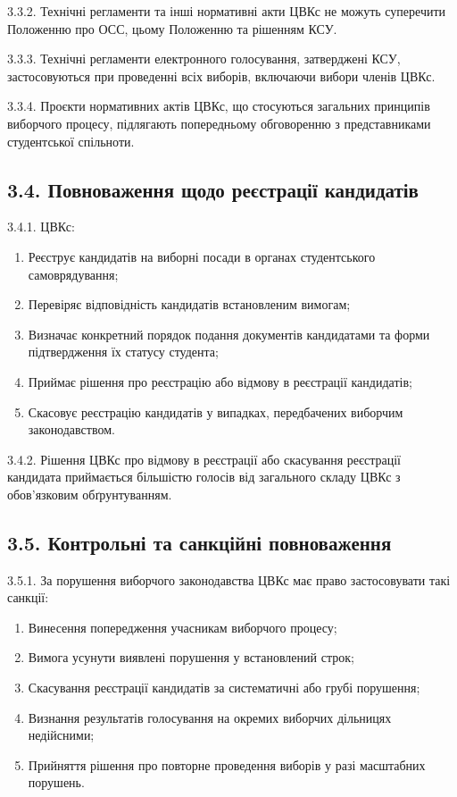     3.3.2. Технічні регламенти та інші нормативні акти ЦВКс не можуть суперечити Положенню про ОСС, цьому Положенню та рішенням КСУ.

    3.3.3. Технічні регламенти електронного голосування, затверджені КСУ, застосовуються при проведенні всіх виборів, включаючи вибори членів ЦВКс.

    3.3.4. Проєкти нормативних актів ЦВКс, що стосуються загальних принципів виборчого процесу, підлягають попередньому обговоренню з представниками студентської спільноти.

\subsection*{3.4. Повноваження щодо реєстрації кандидатів}
    3.4.1. ЦВКс:

        \begin{enumerate}[label=\alph*)]
            \item Реєструє кандидатів на виборні посади в органах студентського самоврядування;
            \item Перевіряє відповідність кандидатів встановленим вимогам;
            \item Визначає конкретний порядок подання документів кандидатами та форми підтвердження їх статусу студента;
            \item Приймає рішення про реєстрацію або відмову в реєстрації кандидатів;
            \item Скасовує реєстрацію кандидатів у випадках, передбачених виборчим законодавством.
        \end{enumerate}

    3.4.2. Рішення ЦВКс про відмову в реєстрації або скасування реєстрації кандидата приймається більшістю голосів від загального складу ЦВКс з обов'язковим обґрунтуванням.

\subsection*{3.5. Контрольні та санкційні повноваження}
    3.5.1. За порушення виборчого законодавства ЦВКс має право застосовувати такі санкції:

        \begin{enumerate}[label=\alph*)]
            \item Винесення попередження учасникам виборчого процесу;
            \item Вимога усунути виявлені порушення у встановлений строк;
            \item Скасування реєстрації кандидатів за систематичні або грубі порушення;
            \item Визнання результатів голосування на окремих виборчих дільницях недійсними;
            \item Прийняття рішення про повторне проведення виборів у разі масштабних порушень.
        \end{enumerate}

